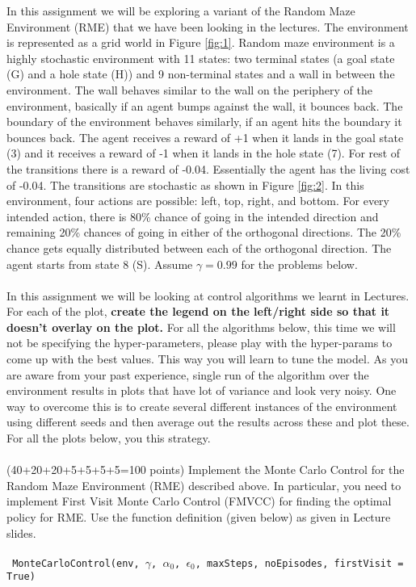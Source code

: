 \documentclass[a4 paper]{article}
\numberwithin{equation}{section}
\newcommand{\problem}[2]{~\\\fbox{\textbf{Problem #1}}\\(#2 points)\newline\newline}
\newcommand{\0}{\mathbf{0}}
\begin{document}
\noindent In this assignment we will be exploring a variant of the Random Maze Environment (RME) that we have been looking in the lectures. The environment is represented as a grid world in Figure \ref{fig:1}. Random maze environment is a highly stochastic environment with 11 states: two terminal states (a goal state (G) and a hole state (H)) and 9 non-terminal states and a wall in between the environment. The wall behaves similar to the wall on the periphery of the environment, basically if an agent bumps against the wall, it bounces back. The boundary of the environment behaves similarly, if an agent hits the boundary it bounces back. The agent receives a reward of +1 when it lands in the goal state (3) and it receives a reward of -1 when it lands in the hole state (7). For rest of the transitions there is a reward of -0.04. Essentially the agent has the living cost of -0.04. The transitions are stochastic as shown in Figure \ref{fig:2}. In this environment, four actions are possible: left, top, right, and bottom. For every intended action, there is 80\% chance of going in the intended direction and remaining 20\% chances of going in either of the orthogonal directions. The 20\% chance gets equally distributed between each of the orthogonal direction. The agent starts from state 8 (S).  Assume $\gamma = 0.99$ for the problems below. \\
\\
\noindent In this assignment we will be looking at control algorithms we learnt in Lectures. For each of the plot, \textbf{create the legend on the left/right side so that it doesn't overlay on the plot.}  For all the algorithms below, this time we will not be specifying the hyper-parameters, please play with the hyper-params to come up with the best values. This way you will learn to tune the model. As you are aware from your past experience,  single run of the algorithm over the environment results in plots that have lot of variance and look very noisy. One way to overcome this is to create several different instances of the environment using different seeds and then average out the results across these and plot these. For all the plots below, you this strategy.  
\newpage
\problem{1: Monte Carlo Control}{40+20+20+5+5+5+5=100}
Implement the Monte Carlo Control for the Random Maze Environment (RME) described above. In particular, you need to implement First Visit Monte Carlo Control (FMVCC) for finding the optimal policy for RME. Use the function definition (given below) as given in Lecture slides. \\
\\
\texttt{
MonteCarloControl(env, $\gamma$, $\alpha_{0}$, $\epsilon_{0}$, maxSteps, noEpisodes, firstVisit = True)
}
\end{document}
